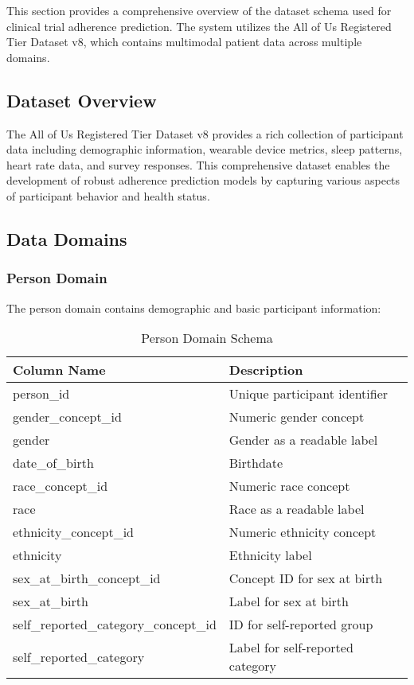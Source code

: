 \documentclass[12pt]{article}
\begin{document}
This section provides a comprehensive overview of the dataset schema used for clinical trial adherence prediction. The system utilizes the All of Us Registered Tier Dataset v8, which contains multimodal patient data across multiple domains.

\subsection{Dataset Overview}
The All of Us Registered Tier Dataset v8 provides a rich collection of participant data including demographic information, wearable device metrics, sleep patterns, heart rate data, and survey responses. This comprehensive dataset enables the development of robust adherence prediction models by capturing various aspects of participant behavior and health status.

\subsection{Data Domains}

\subsubsection{Person Domain}
The person domain contains demographic and basic participant information:
\begin{table}[h]
\centering
\begin{tabular}{|l|l|}
\hline
\textbf{Column Name} & \textbf{Description} \\
\hline
person\_id & Unique participant identifier \\
gender\_concept\_id & Numeric gender concept \\
gender & Gender as a readable label \\
date\_of\_birth & Birthdate \\
race\_concept\_id & Numeric race concept \\
race & Race as a readable label \\
ethnicity\_concept\_id & Numeric ethnicity concept \\
ethnicity & Ethnicity label \\
sex\_at\_birth\_concept\_id & Concept ID for sex at birth \\
sex\_at\_birth & Label for sex at birth \\
self\_reported\_category\_concept\_id & ID for self-reported group \\
self\_reported\_category & Label for self-reported category \\
\hline
\end{tabular}
\caption{Person Domain Schema}
\end{table}
\end{document}
